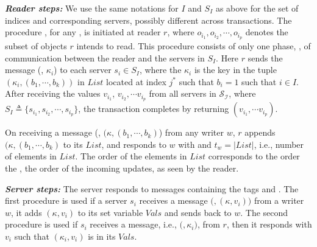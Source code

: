 \textit{\textbf{Reader steps:}}  
We use the same notations for $I$ and $S_I$ as above for the set of indices and corresponding servers, possibly 
different across transactions.
The procedure  , 
for any  \rot{}, 
is  initiated at  reader  $r$, where   $o_{i_1},  o_{i_2}, \cdots, o_{i_p}$  denotes the  subset  of  
objects $r$ 
intends to read. This procedure
consists of only one phase,  {\readValue},  of communication 
between the reader and the servers in $S_I$.   Here $r$ sends  the message
(\readValueTag, ${\kappa}_i$) to each server $s_i \in S_I$, where 
the ${\kappa}_i$ is the key in  the tuple $({\kappa}_{i}, (b_{1}, \cdots, b_{k}))$  in  $List$ located at  index $j^*$ such that $b_i =1$ such that 
$i \in I$. %
After
receiving the values $v_{i_1}$, $v_{i_2}, \cdots v_{i_p}$ from all  servers in $\mathcal{S_I}$,  where $S_I \triangleq \{s_{i_1},  s_{i_2}, \cdots, s_{i_p}\}$, the transaction completes by 
returning $(v_{i_1}, \cdots v_{i_p})$.

On receiving a message  
(\informReaderTag, $({\kappa}, (b_{1}, \cdots, b_{k})$) from any writer $w$,  $r$ appends  
$({\kappa}, (b_{1}, \cdots, b_{k})$ to its  $List$,  and responds to $w$ with  
{\ackTag} and $t_w = |List|$, i.e., number of elements in $List$.
The order of the  elements in  $List$ corresponds to  the order  
the \wots{}, the order of the incoming  {\informReaderTag} updates,  as seen by the reader.


\textit{\textbf{Server steps:}} The server responds to messages containing the tags 
{\writeValueTag} and \readValueTag.  The first procedure is used if a server $s_i$ receives a 
message  $(${\writeValueTag}$, ({\kappa}, v_{i}))$  from a writer $w$,  it  adds $({\kappa}, v_i)$ to its set variable   $Vals$ and sends {\ackTag} back to $w$.
The second procedure is used  if  $s_i$ receives a message, i.e., $(${\readValueTag}$, {\kappa}_{i})$, from $r$, then it responds with $v_i$ such that $({\kappa}_{i}, v_i)$ is in its $Vals$.


